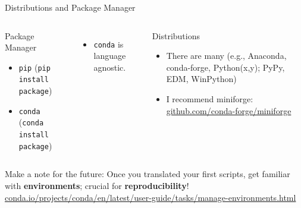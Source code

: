 \documentclass[usepdftitle=false, aspectratio=169]{beamer}
\newcommand{\code}[1]{\texttt{\color{mygreen}#1}}
\begin{document}
\begin{frame}
  {Distributions and Package Manager}

  \begin{columns}
    \begin{block}{Package Manager}
      \begin{itemize}
        \item \code{pip} (\code{pip install package})
        \item \code{conda} (\code{conda install package})
      \end{itemize}
    \end{block}
    \begin{itemize}
      \item \code{conda} is language agnostic.
    \end{itemize}

    \begin{block}{Distributions}
      \begin{itemize}
        \item There are many (e.g., Anaconda, conda-forge, Python(x,y); PyPy,
          EDM, WinPython)
        \item I recommend miniforge:
          \href{https://github.com/conda-forge/miniforge}{github.com/conda-forge/miniforge}
      \end{itemize}
    \end{block}

  \end{columns}

  \vspace{1cm}

    Make a note for the future: Once you translated your first scripts, get
    familiar with \textbf{environments}; crucial for \textbf{reproducibility}!
    \href{https://conda.io/projects/conda/en/latest/user-guide/tasks/manage-environments.html}{conda.io/projects/conda/en/latest/user-guide/tasks/manage-environments.html}

\end{frame}
\end{document}
